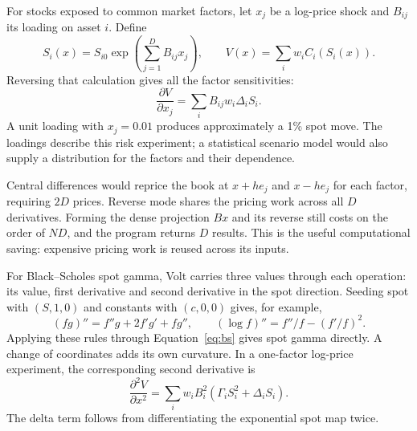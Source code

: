 \documentclass[8pt]{strategynet-journal}
\begin{document}
\begin{SNcolumns}
For stocks exposed to common market factors, let $x_j$ be a log-price shock
and $B_{ij}$ its loading on asset $i$. Define
\begin{equation}
 S_i(x)=S_{i0}\exp\!\left(\sum_{j=1}^{D}B_{ij}x_j\right),\qquad
 V(x)=\sum_i w_iC_i(S_i(x)).\label{eq:factors}
\end{equation}
Reversing that calculation gives all the factor sensitivities:
\begin{equation}
 \frac{\partial V}{\partial x_j}
 =\sum_i B_{ij}w_i\Delta_i S_i.\label{eq:factorgradient}
\end{equation}
A unit loading with $x_j=0.01$ produces approximately a 1\% spot move. The
loadings describe this risk experiment; a statistical scenario model would
also supply a distribution for the factors and their dependence.

\begin{center}
\begin{minipage}{\linewidth}
\centering
{}
\end{minipage}
\end{center}
Central differences would reprice the book at $x+he_j$ and $x-he_j$ for each
factor, requiring $2D$ prices. Reverse mode shares the pricing work across all
$D$ derivatives. Forming the dense projection $Bx$ and its reverse still costs
on the order of $ND$, and the program returns $D$ results. This is the useful
computational saving: expensive pricing work is reused across its inputs.

For Black--Scholes spot gamma, Volt carries three values through each operation: its value, first derivative and
second derivative in the spot direction. Seeding spot with $(S,1,0)$ and
constants with $(c,0,0)$ gives, for example,
\[
 (fg)''=f''g+2f'g'+fg'',\qquad
 (\log f)''=f''/f-(f'/f)^2.
\]
Applying these rules through Equation~\eqref{eq:bs} gives spot gamma directly.
A change of coordinates adds its own curvature. In a one-factor log-price
experiment, the corresponding second derivative is
\[
 \frac{\partial^2V}{\partial x^2}
 =\sum_i w_iB_i^2(\Gamma_i S_i^2+\Delta_i S_i).
\]
The delta term follows from differentiating the exponential spot map twice.



\end{SNcolumns}
\end{document}
